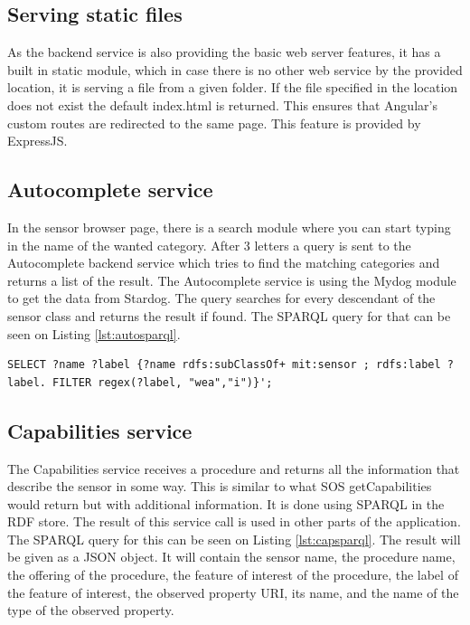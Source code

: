 \subsection{Serving static files}
As the backend service is also providing the basic web server features, it has a built in static module, which in case there is no other web service by the provided location, it is serving a file from a given folder. If the file specified in the location does not exist the default index.html is returned. 
This ensures that Angular's custom routes are redirected to the same page. This feature is provided by ExpressJS.

\subsection{Autocomplete service}
In the sensor browser page, there is a search module where you can start typing in the name of the wanted category. After 3 letters a query is sent to the Autocomplete backend service which tries to find the matching categories and returns a list of the result. The Autocomplete service is using the Mydog module to get the data from Stardog. 
The query searches for every descendant of the sensor class and returns the result if found. The SPARQL query for that can be seen on Listing \ref{lst:autosparql}. 
\begin{lstlisting}[caption={SPARQL query for Autocomplete on the "wea" string\label{lst:autosparql}}]
SELECT ?name ?label {?name rdfs:subClassOf+ mit:sensor ; rdfs:label ?label. FILTER regex(?label, "wea","i")}';
\end{lstlisting}

\subsection{Capabilities service}
The Capabilities service receives a procedure and returns all the information that describe the sensor in some way. This is similar to what SOS getCapabilities would return but with additional information. It is done using SPARQL in the RDF store. The result of this service call is used in other parts of the application. The SPARQL query for this can be seen on Listing \ref{lst:capsparql}. The result will be given as a JSON object. It will contain the sensor name, the procedure name, the offering of the procedure, the feature of interest of the procedure, the label of the feature of interest, the observed property URI, its name, and the name of the type of the observed property. 


